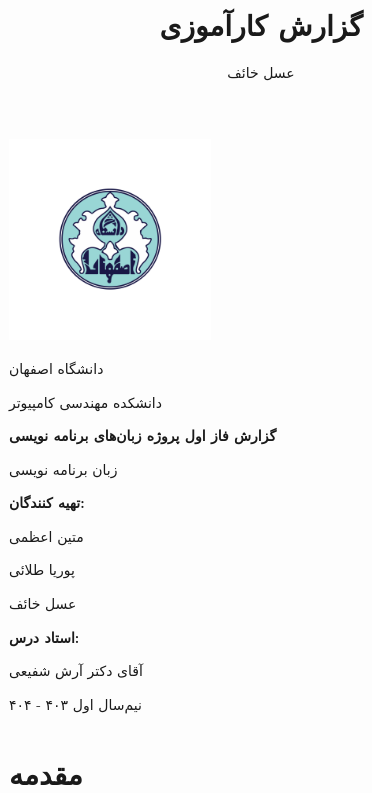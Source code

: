 \documentclass[12pt, a4paper]{report}
\title{گزارش کارآموزی}
\author{عسل خائف}
\begin{document}
	\begin{titlepage}
		\centering
		\includegraphics[width=0.4\textwidth]{img/university-logo.png}
		
		{\Large دانشگاه اصفهان}\par
		{\Large دانشکده مهندسی کامپیوتر}\par\vspace{2cm}
		
		\textbf
		{\Huge گزارش فاز اول پروژه زبان‌های برنامه نویسی}\par\vspace{1.5cm}
		{\Huge زبان برنامه نویسی }\par\vspace{1.5cm}
		
		\large
		\textbf{تهیه کنندگان:}\par{متین اعظمی}\par{پوریا طلائی}\par{عسل خائف}\par\vspace{1cm}  

		\textbf{استاد درس:}\par{آقای دکتر آرش شفیعی}\par\vspace{3cm}
		
		\par{نیم‌سال اول ۴۰۳ - ۴۰۴}\par\vspace{0.5cm}
				
		
	\end{titlepage}
	\tableofcontents
	\listoftables
	\listoffigures
	
\chapter{مقدمه}
\end{document}
